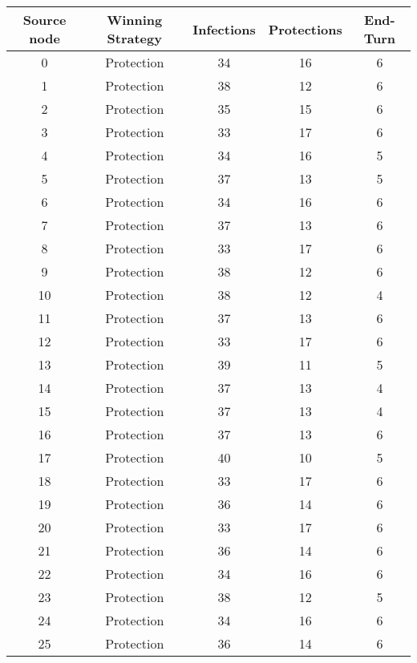 \documentclass[results.tex]{subfiles}
\begin{document}
\begin{center}
  \begin{tabular}{| c || c | c | c | c |}
    \hline
    {\bfseries Source node} & {\bfseries Winning Strategy} & {\bfseries Infections} & {\bfseries Protections} & {\bfseries End-Turn} \\  %
    \hline\hline
    0 & Protection & 34 & 16 & 6 \\ 
    \hline
    1 & Protection & 38 & 12 & 6 \\ 
    \hline
    2 & Protection & 35 & 15 & 6 \\ 
    \hline
    3 & Protection & 33 & 17 & 6 \\ 
    \hline
    4 & Protection & 34 & 16 & 5 \\ 
    \hline
    5 & Protection & 37 & 13 & 5 \\ 
    \hline
    6 & Protection & 34 & 16 & 6 \\ 
    \hline
    7 & Protection & 37 & 13 & 6 \\ 
    \hline
    8 & Protection & 33 & 17 & 6 \\ 
    \hline
    9 & Protection & 38 & 12 & 6 \\ 
    \hline
    10 & Protection & 38 & 12 & 4 \\ 
    \hline
    11 & Protection & 37 & 13 & 6 \\ 
    \hline
    12 & Protection & 33 & 17 & 6 \\ 
    \hline
    13 & Protection & 39 & 11 & 5 \\ 
    \hline
    14 & Protection & 37 & 13 & 4 \\ 
    \hline
    15 & Protection & 37 & 13 & 4 \\ 
    \hline
    16 & Protection & 37 & 13 & 6 \\ 
    \hline
    17 & Protection & 40 & 10 & 5 \\ 
    \hline
    18 & Protection & 33 & 17 & 6 \\ 
    \hline
    19 & Protection & 36 & 14 & 6 \\ 
    \hline
    20 & Protection & 33 & 17 & 6 \\ 
    \hline
    21 & Protection & 36 & 14 & 6 \\ 
    \hline
    22 & Protection & 34 & 16 & 6 \\ 
    \hline
    23 & Protection & 38 & 12 & 5 \\ 
    \hline
    24 & Protection & 34 & 16 & 6 \\ 
    \hline
    25 & Protection & 36 & 14 & 6 \\ 

\end{tabular}
\end{center}
\end{document}
